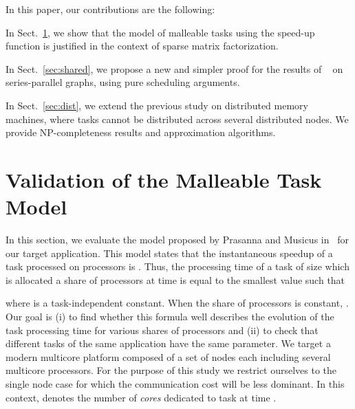 \documentclass{llncs}
\begin{document}
In this paper, our contributions are the following:
\begin{compactitem}
\item In Sect.~\ref{sec:motiv}, we show that the model of malleable
  tasks using the  speed-up function is justified in the
  context of sparse matrix factorization.
\item In Sect.~\ref{sec:shared}, we propose a new and simpler proof
  for the results of ~\cite{prasmus,prasmus2} on series-parallel
  graphs, using pure scheduling arguments. 
\item In Sect.~\ref{sec:dist}, we extend the previous study on
  distributed memory machines, where tasks cannot be distributed
  across several distributed nodes. We provide NP-completeness
  results and approximation algorithms.
\end{compactitem}



\section{Validation of the Malleable Task Model}
\label{sec:motiv}

In this section, we evaluate the model proposed by
Prasanna and Musicus in~\cite{prasmus,prasmus2} for our target
application. This model states that the instantaneous speedup of a task processed on
 processors is . Thus, the processing time of a task
 of size  which is allocated a share of processors 
at time  is equal to the smallest value  such that

where  is a task-independent constant. When the share
of processors  is constant, . Our goal is
(i) to find whether this formula well describes the evolution of the
task processing time for various shares of processors and (ii) to
check that different tasks of the same application have the same
 parameter.  We target a modern multicore platform composed of
a set of nodes each including several multicore processors. For the
purpose of this study we restrict ourselves to the single node case
for which the communication cost will be less dominant. In this
context,  denotes the number of \emph{cores} dedicated to task
 at time .
\end{document}
